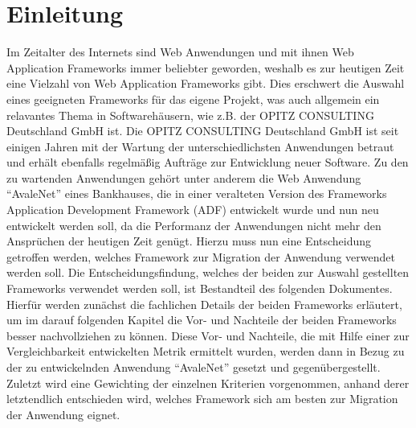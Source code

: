 \section{Einleitung}
Im Zeitalter des Internets sind Web Anwendungen und mit ihnen Web Application Frameworks immer beliebter geworden, weshalb es zur heutigen Zeit eine Vielzahl von Web Application Frameworks gibt. Dies erschwert die Auswahl eines geeigneten Frameworks für das eigene Projekt, was auch allgemein ein relavantes Thema in Softwarehäusern, wie z.B. der OPITZ CONSULTING Deutschland GmbH ist. Die OPITZ CONSULTING Deutschland GmbH ist seit einigen Jahren mit der Wartung der unterschiedlichsten Anwendungen betraut und erhält ebenfalls regelmäßig Aufträge zur Entwicklung neuer Software. Zu den zu wartenden Anwendungen gehört unter anderem die Web Anwendung "`AvaleNet"' eines Bankhauses, die in einer veralteten Version des Frameworks Application Development Framework (ADF) entwickelt wurde und nun neu entwickelt werden soll, da die Performanz der Anwendungen nicht mehr den Ansprüchen der heutigen Zeit genügt. Hierzu muss nun eine Entscheidung getroffen werden, welches Framework zur Migration der Anwendung verwendet werden soll. Die Entscheidungsfindung, welches der beiden zur Auswahl gestellten Frameworks verwendet werden soll, ist Bestandteil des folgenden Dokumentes. Hierfür werden zunächst die fachlichen Details der beiden Frameworks erläutert, um im darauf folgenden Kapitel die Vor- und Nachteile der beiden Frameworks besser nachvollziehen zu können. Diese Vor- und Nachteile, die mit Hilfe einer zur Vergleichbarkeit entwickelten Metrik ermittelt wurden, werden dann in Bezug zu der zu entwickelnden Anwendung "`AvaleNet"' gesetzt und gegenübergestellt. Zuletzt wird eine Gewichting der einzelnen Kriterien vorgenommen, anhand derer letztendlich entschieden wird, welches Framework sich am besten zur Migration der Anwendung eignet.